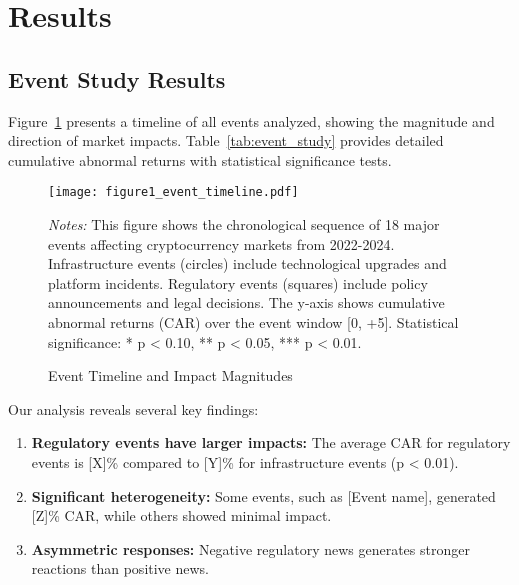 \documentclass[12pt]{article}
\begin{document}

\section{Results}

\subsection{Event Study Results}

Figure~\ref{fig:timeline} presents a timeline of all events analyzed, showing the magnitude and direction of market impacts. Table~\ref{tab:event_study} provides detailed cumulative abnormal returns with statistical significance tests.

\begin{figure}[htbp]
    \centering
    \texttt{[image: figure1\_event\_timeline.pdf]}
    \caption{Event Timeline and Impact Magnitudes}
    \label{fig:timeline}
    \begin{minipage}{\textwidth}
        \small
        \textit{Notes:} This figure shows the chronological sequence of 18 major events affecting cryptocurrency markets from 2022-2024. Infrastructure events (circles) include technological upgrades and platform incidents. Regulatory events (squares) include policy announcements and legal decisions. The y-axis shows cumulative abnormal returns (CAR) over the event window [0, +5]. Statistical significance: * p < 0.10, ** p < 0.05, *** p < 0.01.
    \end{minipage}
\end{figure}



Our analysis reveals several key findings:

\begin{enumerate}
    \item \textbf{Regulatory events have larger impacts:} The average CAR for regulatory events is [X]\% compared to [Y]\% for infrastructure events (p < 0.01).

    \item \textbf{Significant heterogeneity:} Some events, such as [Event name], generated [Z]\% CAR, while others showed minimal impact.

    \item \textbf{Asymmetric responses:} Negative regulatory news generates stronger reactions than positive news.
\end{enumerate}
\end{document}
